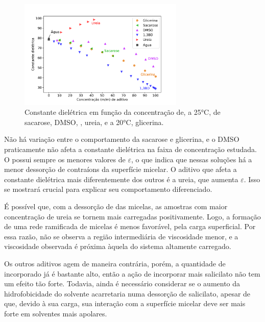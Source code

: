 		\begin{figure}[h]
			\centering
			\includegraphics[width=0.7\textwidth]{imagens/propriedades/cte_dieletrica}
			\caption{Constante dielétrica em função da concentração de, a 25°C, de sacarose,\cite{Malmberg1950a} DMSO,\cite{Kaatze1989a} \BD,\cite{Piekarski1995} ureia\cite{Wyman1933}, e a 20°C, glicerina.\cite{Akerlof1932}}  %
			\label{fig:cte_dieletrica}
		\end{figure}
	
		Não há variação entre o comportamento da sacarose e glicerina, e o DMSO praticamente não afeta a constante dielétrica na faixa de concentração estudada. O \BD{} possui sempre os menores valores de \(\varepsilon\), o que indica que nessas soluções há a menor dessorção de contraíons da superfície micelar. O aditivo que afeta a constante dielétrica mais diferentemente dos outros é a ureia, que aumenta \(\varepsilon\). Isso se mostrará crucial para explicar seu comportamento diferenciado.
	
		É possível que, com a dessorção de \Sal{} das micelas, as amostras com maior concentração de ureia se tornem mais carregadas positivamente. Logo, a formação de uma rede ramificada de micelas é menos favorável, pela carga superficial. Por essa razão, não se observa a região intermediária de viscosidade menor, e a viscosidade observada é próxima àquela do sistema altamente carregado.
		
		Os outros aditivos agem de maneira contrária, porém, a quantidade de \Sal{} incorporado já é bastante alto, então a ação de incorporar mais salicilato não tem um efeito tão forte. %
		Todavia, ainda é necessário considerar se o aumento da hidrofobicidade do solvente acarretaria numa dessorção de salicilato, apesar de que, devido à sua carga, sua interação com a superfície micelar deve ser mais forte em solventes mais apolares.
	
